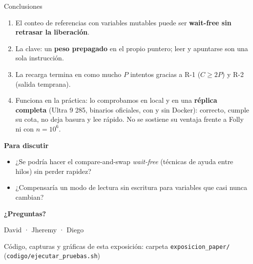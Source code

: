\documentclass[aspectratio=169,11pt]{beamer}
\newcommand{\clave}[1]{\textcolor{acento}{\textbf{#1}}}
\newcommand{\elexpositor}{}
\newcommand{\expone}[1]{\renewcommand{\elexpositor}{#1}}
\begin{document}
\begin{frame}{Conclusiones}
  \begin{enumerate}\small
    \item El conteo de referencias con variables mutables puede ser \clave{wait-free sin retrasar la liberación}.
    \item La clave: un \textbf{peso prepagado} en el propio puntero; leer y apuntarse son una sola instrucción.
    \item La recarga termina en como mucho $P$ intentos gracias a R-1 ($C \ge 2P$) y R-2 (salida temprana).
    \item Funciona en la práctica: lo comprobamos en local y en una \textbf{réplica completa} (Ultra 9 285, binarios oficiales, con y sin Docker): correcto, cumple su cota, no deja basura y lee rápido. No se sostiene su ventaja frente a Folly ni con $n = 10^6$.
  \end{enumerate}
  \bigskip
  \textbf{Para discutir}
  \begin{itemize}\small
    \item ¿Se podría hacer el compare-and-swap \emph{wait-free} (técnicas de ayuda entre hilos) sin perder rapidez?
    \item ¿Compensaría un modo de lectura sin escritura para variables que casi nunca cambian?
  \end{itemize}
\end{frame}

{
\begin{frame}[plain]
  \centering\vfill
  {\fontsize{32}{36}\selectfont\bfseries ¿Preguntas?}\par\bigskip
  {\large David · Jheremy · Diego}\par\vfill
  {\small\color{gris}Código, capturas y gráficas de esta exposición: carpeta \texttt{exposicion\_paper/} (\texttt{codigo/ejecutar\_pruebas.sh})}
  \vspace*{6mm}
\end{frame}}

\expone{}
\end{document}
